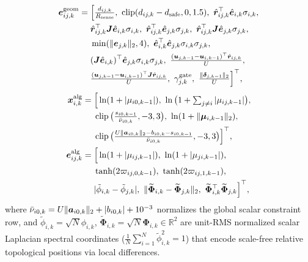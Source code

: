 \begin{equation}
\begin{split}
 \boldsymbol e_{ij,k}^{\mathrm{geom}}&=\Big[\tfrac{d_{ij,k}}{R_{\mathrm{sense}}},\ \clip(d_{ij,k}-\ds,0,1.5),\ \hat{\br}_{ij,k}^{\top}\hat{\be}_{i,k}\sigma_{i,k},\\
 &\quad\ \hat{\br}_{ij,k}^{\top}\bJ\hat{\be}_{i,k}\sigma_{i,k},\ \hat{\br}_{ij,k}^{\top}\hat{\be}_{j,k}\sigma_{j,k},\ \hat{\br}_{ij,k}^{\top}\bJ\hat{\be}_{j,k}\sigma_{j,k},\\
 &\quad\ \min(\norm{\be_{j,k}}_2,4),\ \hat{\be}_{i,k}^{\top}\hat{\be}_{j,k}\sigma_{i,k}\sigma_{j,k},\\
 &\quad\ (\bJ\hat{\be}_{i,k})^{\top}\hat{\be}_{j,k}\sigma_{i,k}\sigma_{j,k},\ \tfrac{(\bu_{j,k-1}-\bu_{i,k-1})^{\top}\hat{\br}_{ij,k}}{U},\\
 &\quad\ \tfrac{(\bu_{j,k-1}-\bu_{i,k-1})^{\top}\bJ\hat{\br}_{ij,k}}{U},\ \gamma_{j,k}^{\mathrm{gate}},\ \tfrac{\norm{\boldsymbol\delta_{j,k-1}}_2}{U}\Big]^{\top},
\end{split}\label{eq:edge-geom}
\end{equation}
\begin{equation}
\begin{split}
 \boldsymbol x_{i,k}^{\mathrm{alg}}&=\Big[\ln(1+|\mu_{i0,k-1}|),\ \ln\big(1+\textstyle\sum_{j\ne i}|\mu_{ij,k-1}|\big),\\
 &\quad\ \clip\big(\tfrac{s_{i0,k-1}}{\bar\nu_{i0,k}},-3,3\big),\ \ln(1+\norm{\boldsymbol\mu_{i,k-1}}_2),\\
 &\quad\ \clip\big(\tfrac{U\norm{\boldsymbol a_{i0,k}}_2-b_{i0,k}-s_{i0,k-1}}{\bar\nu_{i0,k}},-3,3\big)\Big]^{\top},\\
 \boldsymbol e_{ij,k}^{\mathrm{alg}}&=\Big[\ln(1+|\mu_{ij,k-1}|),\ \ln(1+|\mu_{ji,k-1}|),\\
 &\quad\ \tanh(2\varpi_{ij,0,k-1}),\ \tanh(2\varpi_{ij,1,k-1}),\\
 &\quad\ |\tilde\phi_{i,k}-\tilde\phi_{j,k}|,\ \norm{\widetilde{\boldsymbol\Phi}_{i,k}-\widetilde{\boldsymbol\Phi}_{j,k}}_2,\ \widetilde{\boldsymbol\Phi}_{i,k}^{\top}\widetilde{\boldsymbol\Phi}_{j,k}\Big]^{\top},
\end{split}\label{eq:alg-feat}
\end{equation}
where $\bar\nu_{i0,k}=U\lVert\boldsymbol a_{i0,k}\rVert_2+|b_{i0,k}|+10^{-3}$ normalizes the global scalar constraint row, and $\tilde\phi_{i,k}=\sqrt{N}\phi_{i,k}$, $\widetilde{\boldsymbol\Phi}_{i,k}=\sqrt{N}\boldsymbol\Phi_{i,k}\in\mathbb R^2$ are unit-RMS normalized scalar Laplacian spectral coordinates ($\frac1N\sum_{i=1}^N\tilde\phi_{i,k}^2=1$) that encode scale-free relative topological positions via local differences.

